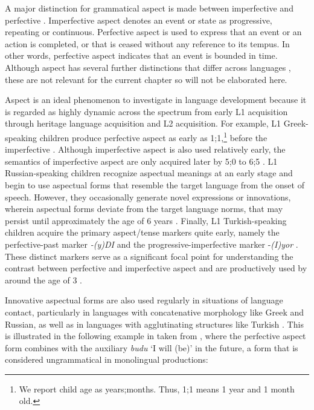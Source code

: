 \documentclass[output=paper,colorlinks,citecolor=brown]{langscibook}
\begin{document}
A major distinction for grammatical aspect is made between imperfective and perfective \parencite{comrie1976}. 
Imperfective aspect denotes an event or state as progressive, repeating or continuous. 
Perfective aspect is used to express that an event or an action is completed, or that is ceased without any reference to its tempus. 
In other words, perfective aspect indicates that an event is bounded in time. Although aspect has several further distinctions that differ across languages \parencite{gagarina2000acquisition}, these are not relevant for the current chapter so will not be elaborated here. 

Aspect  is an ideal phenomenon to investigate in language development because it is regarded as highly dynamic across the spectrum from early L1 acquisition through heritage language acquisition and L2 acquisition.
For example, L1 Greek-speaking children produce perfective aspect as early as 1;1,\footnote{We report child age as years;months. Thus, 1;1 means 1 year and 1 month old.} before the imperfective \parencite{stephany1997acquisition, konstantzou2013perfective}. Although imperfective aspect is also used relatively early, the semantics of imperfective aspect are only acquired later by 5;0 to 6;5 \parencite{delidaki2006acquisition, panitsa2010aspects}. L1 Russian-speaking children recognize aspectual meanings at an early stage and begin to use aspectual forms that resemble the target language from the onset of speech. However, they occasionally generate novel expressions or innovations, wherein aspectual forms deviate from the target language norms, that may persist until approximately the age of 6 years \parencite{ceytlin2000jazyk, Gagarina2007, gagarina2011acquisition, kistanova2019acquisition}. Finally, L1 Turkish-speaking children acquire the primary aspect/tense markers quite early, namely the perfective-past marker \textit{-(y)DI} and the progressive-imperfective marker -\textit{(I)yor} \parencite{aksukoc1988}. These distinct markers serve as a significant focal point for understanding the contrast between perfective and imperfective aspect and are productively used by around the age of 3 \parencite{acarlar2008adapting}. 

Innovative aspectual forms are also used regularly in situations of language contact, particularly in languages with concatenative morphology like Greek and Russian, as well as in languages with agglutinating structures like Turkish \parencite{laleko2008compositional, Montrul2015, antonova2016aspect,  gagarina2020first}. This is illustrated in the following example in  taken from \textcite[115]{gagarina2020first}, where the perfective aspect form combines with the auxiliary \textit{budu} `I will (be)’ in the future, a form that is considered ungrammatical in monolingual productions:
\end{document}
